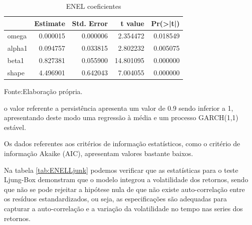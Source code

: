 \documentclass[
  12pt,
  a4paper,
  openany]{book}
\newenvironment{Shaded}{\begin{snugshade}}{\end{snugshade}}
\newcommand{\CommentTok}[1]{\textcolor[rgb]{0.56,0.35,0.01}{\textit{#1}}}
\newcommand{\DataTypeTok}[1]{\textcolor[rgb]{0.13,0.29,0.53}{#1}}
\newcommand{\DecValTok}[1]{\textcolor[rgb]{0.00,0.00,0.81}{#1}}
\newcommand{\KeywordTok}[1]{\textcolor[rgb]{0.13,0.29,0.53}{\textbf{#1}}}
\newcommand{\NormalTok}[1]{#1}
\newcommand{\OperatorTok}[1]{\textcolor[rgb]{0.81,0.36,0.00}{\textbf{#1}}}
\newcommand{\OtherTok}[1]{\textcolor[rgb]{0.56,0.35,0.01}{#1}}
\newcommand{\StringTok}[1]{\textcolor[rgb]{0.31,0.60,0.02}{#1}}
\begin{document}
\scriptsize

\begin{Shaded}
\end{Shaded}

\normalsize

\begin{table}[!h]

\caption{\label{tab:ENELcoef}ENEL coeficientes}
\centering
\begin{tabular}[t]{lrrrr}
\toprule
  &  Estimate &  Std. Error &  t value & Pr(>|t|)\\
\midrule
omega & 0.000015 & 0.000006 & 2.354472 & 0.018549\\
alpha1 & 0.094757 & 0.033815 & 2.802232 & 0.005075\\
beta1 & 0.827381 & 0.055900 & 14.801095 & 0.000000\\
shape & 4.496901 & 0.642043 & 7.004055 & 0.000000\\
\bottomrule
\end{tabular}
\end{table}
\FloatBarrier
\centering

Fonte:Elaboração própria.

\justifying
\bigskip

o valor referente a persistência apresenta um valor de 0.9 sendo inferior a 1, apresentando deste modo uma regressão à média e um processo GARCH(1,1) estável.

Os dados referentes aos critérios de informação estatísticos, como o critério de informação Akaike (AIC), apresentam valores bastante baixos.

Na tabela \ref{tab:ENELLjunk} podemos verificar que as estatísticas para o teste Ljung-Box demonstram que o modelo integrou a volatilidade dos retornos, sendo que não se pode rejeitar a hipótese nula de que não existe auto-correlação entre os resíduos estandardizados, ou seja, as especificações são adequadas para capturar a auto-correlação e a variação da volatilidade no tempo nas series dos retornos.
\end{document}
